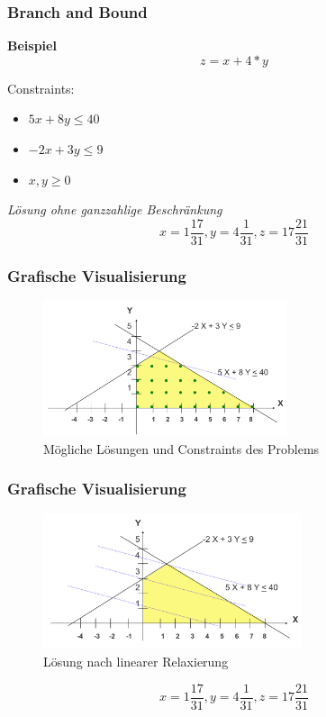 \documentclass{beamer}
\begin{document}
  \begin{frame}
    \frametitle{Branch and Bound}
    \textbf{Beispiel}
    $$z = x + 4 * y$$

    Constraints:
    \begin{itemize}
      \item $5x + 8y \leq 40$
      \item $-2x + 3y \leq 9$
      \item $x, y \geq 0$ 
    \end{itemize}

    \pause
    \vspace{1em}

    \textit{Lösung ohne ganzzahlige Beschränkung}
    $$x = 1\frac{17}{31}, y = 4\frac{1}{31}, z = 17\frac{21}{31}$$
  \end{frame}

  \begin{frame}
    \frametitle{Grafische Visualisierung}
    \begin{figure}
      \centering
      \includegraphics[width=\linewidth,height=150px,keepaspectratio]{example_graphical_representation.png}
      \caption{Mögliche Lösungen und Constraints des Problems}
    \end{figure}
  \end{frame}

  \begin{frame}
    \frametitle{Grafische Visualisierung}
    \begin{figure}
      \centering
      \includegraphics[width=\linewidth,height=150px,keepaspectratio]{example_noninteger_solution.png}
      \caption{Lösung nach linearer Relaxierung}
    \end{figure}
    $$x = 1\frac{17}{31}, y = 4\frac{1}{31}, z = 17\frac{21}{31}$$
  \end{frame}
\end{document}
